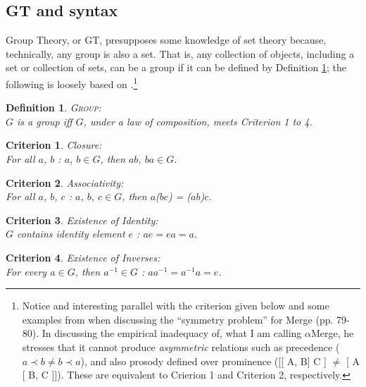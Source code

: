 \documentclass[11pt,twoside]{article}
\theoremstyle{plain}
\newtheorem{criterion}{Criterion}
\newtheorem{definition}{Definition}
\numberwithin{equation}{section}
\theoremstyle{definition}
\newtheorem{phrase string}{Phrase String}
\begin{document}
\subsection{GT and syntax}\label{gtsyn:sub}
Group Theory, or GT, presupposes some knowledge of set theory because, technically, any group is also a set. That is, any collection of objects, including a set or collection of sets, can be a group if it can be defined by Definition \ref{g}; the following is loosely based on \cite{rosen:1995}.\footnote{Notice and interesting parallel with the criterion given below and some examples from \cite{boeckx08bare} when discussing the ``symmetry problem'' for Merge (pp. 79-80). In discussing the empirical inadequacy of, what I am calling $\alpha$Merge, he stresses that it cannot produce \textsl{asymmetric} relations such as precedence ($a \prec b \neq b \prec a$), and also prosody defined over prominence ([[ A, B] C ] $\neq$ [ A [ B, C ]]). These are equivalent to Crierion 1 and Criterion 2, respectively.}

\begin{definition}
\textsc{Group:}\\
$G$ is a group iff $G$, under a law of composition, meets Criterion 1 to 4.\label{g} 
\end{definition}

\begin{criterion}
\textsl{Closure:}\\ For all $a$, $b$ : $a$, $b \in G$, then $ab$, $ba \in G$.
\end{criterion}

\begin{criterion}
\textsl{Associativity:}\\ For all $a$, $b$, $c$ : $a$, $b$, $c \in G$, then $a$($bc$) = ($ab$)$c$.
\end{criterion}

\begin{criterion}
\textsl{Existence of Identity:}\\ $G$ contains identity element $e$ : $ae = ea = a$.
\end{criterion}

\begin{criterion}
\textsl{Existence of Inverses:}\\ For every $a \in G$, then $a^{-1} \in G$ : $aa^{-1} = a^{-1}a = e$.
\end{criterion}
\end{document}
